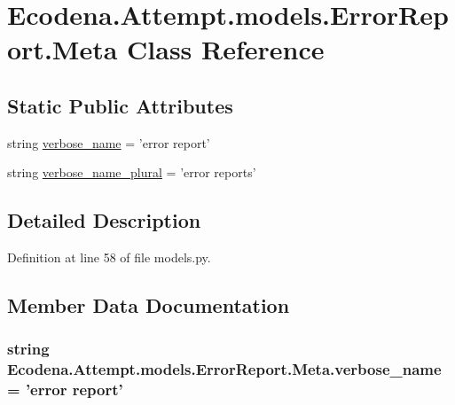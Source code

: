 \hypertarget{class_ecodena_1_1_attempt_1_1models_1_1_error_report_1_1_meta}{
\section{Ecodena.Attempt.models.ErrorReport.Meta Class Reference}
\label{d2/d9e/class_ecodena_1_1_attempt_1_1models_1_1_error_report_1_1_meta}
}
\subsection*{Static Public Attributes}
\begin{DoxyCompactItemize}
\item 
string \hyperlink{class_ecodena_1_1_attempt_1_1models_1_1_error_report_1_1_meta_abb1839b5a65fea4d0a4eaf2449533fd3}{verbose\_\-name} = 'error report'
\item 
string \hyperlink{class_ecodena_1_1_attempt_1_1models_1_1_error_report_1_1_meta_af5a03ae3d989401f2207e282fe47c680}{verbose\_\-name\_\-plural} = 'error reports'
\end{DoxyCompactItemize}


\subsection{Detailed Description}


Definition at line 58 of file models.py.



\subsection{Member Data Documentation}
\hypertarget{class_ecodena_1_1_attempt_1_1models_1_1_error_report_1_1_meta_abb1839b5a65fea4d0a4eaf2449533fd3}{
\subsubsection[{verbose\_\-name}]{\setlength{\rightskip}{0pt plus 5cm}string {\bf Ecodena.Attempt.models.ErrorReport.Meta.verbose\_\-name} = 'error report'}}
\label{d2/d9e/class_ecodena_1_1_attempt_1_1models_1_1_error_report_1_1_meta_abb1839b5a65fea4d0a4eaf2449533fd3}


